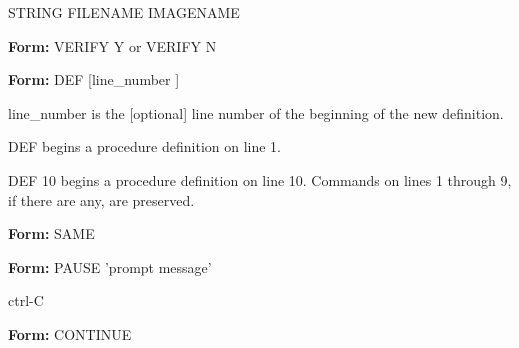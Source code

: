 {\newpage\clearpage
{}%
\begin{hanging}
  \item{STRING FILENAME IMAGENAME}
\end{hanging}%
\lthtmlfigureZ
\lthtmlcheckvsize\clearpage}

{\newpage\clearpage
{}%
\begin{command}
  \item[\textbf{Form: } VERIFY Y or VERIFY N\hfill]{}
\end{command}%
\lthtmlfigureZ
\lthtmlcheckvsize\clearpage}

{\newpage\clearpage
{}%
\begin{command} 
  \item[\textbf{Form: } DEF [line\_number]\hfill]{}
  \item[line\_number]{is the [optional] line number of the
beginning of the new definition.}
\end{command}%
\lthtmlfigureZ
\lthtmlcheckvsize\clearpage}

{\newpage\clearpage
{}%
\begin{example}
  \item[DEF\hfill]{begins a procedure definition on line 1.}
  \item[DEF 10\hfill]{begins a procedure definition on line 10.  
       Commands on lines 1 through 9, if there are any, are preserved.}
\end{example}%
\lthtmlfigureZ
\lthtmlcheckvsize\clearpage}

{\newpage\clearpage
{}%
\begin{command} 
  \item[\textbf{Form: } SAME\hfill]{}
\end{command}%
\lthtmlfigureZ
\lthtmlcheckvsize\clearpage}

{\newpage\clearpage
{}%
\begin{command}
\item[\textbf{Form: } PAUSE 'prompt message'\hfill]{}
\item[ctrl-C\hfill]{}
\end{command}%
\lthtmlfigureZ
\lthtmlcheckvsize\clearpage}

{\newpage\clearpage
{}%
\begin{command}
  \item[\textbf{Form: } CONTINUE\hfill]{}
\end{command}%
\lthtmlfigureZ
\lthtmlcheckvsize\clearpage}

